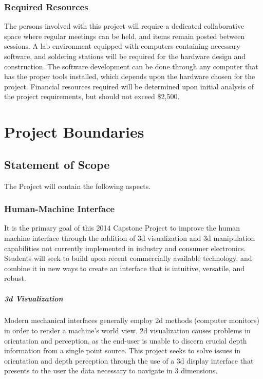 \documentclass[11pt]{report}
\begin{document}
\subsection{Required Resources}
The persons involved with this project will require a dedicated collaborative space where regular meetings can be held, and items remain posted between sessions.
A lab environment equipped with computers containing necessary software, and soldering stations will be required for the hardware design and construction.
The software development can be done through any computer that has the proper tools installed, which depends upon the hardware chosen for the project.
Financial resources required will be determined upon initial analysis of the project requirements, but should not exceed \$2,500.

\chapter{Project Boundaries}
\section{Statement of Scope}
The Project will contain the following aspects.

\subsection{Human-Machine Interface}
It is the primary goal of this 2014 Capstone Project to improve the human machine interface through the addition of \gls{3d} visualization and \gls{3d} manipulation capabilities not currently implemented in industry and consumer electronics.
Students will seek to build upon recent commercially available technology, and combine it in new ways to create an interface that is intuitive, versatile, and robust.

\paragraph{\gls{3d} Visualization}
Modern mechanical interfaces generally employ \gls{2d} methods (computer monitors) in order to render a machine's world view.
2d visualization causes problems in orientation and perception, as the end-user is unable to discern crucial depth information from a single point source.
This project seeks to solve issues in orientation and depth perception through the use of a \gls{3d} display interface that presents to the user the data necessary to navigate in 3 dimensions.
\end{document}
